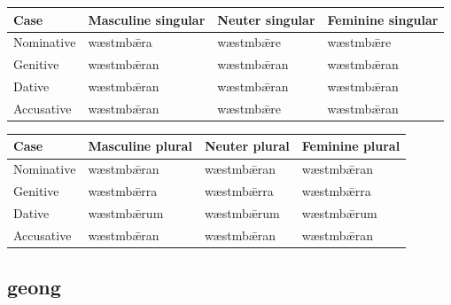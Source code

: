 \par\begingroup
\fontsize{10.5}{13.2}\selectfont
\setlength{\LTleft}{0pt}\setlength{\LTright}{\fill}
\noindent
\begin{tabular}{@{}>{\raggedright\arraybackslash}p{22.0mm}>{\raggedright\arraybackslash}p{31.188mm}>{\raggedright\arraybackslash}p{31.188mm}>{\raggedright\arraybackslash}p{31.188mm}@{}}
\toprule
\textbf{Case} & \textbf{Masculine singular} & \textbf{Neuter singular} & \textbf{Feminine singular} \\
\midrule
Nominative & wæstmbǣra & wæstmbǣre & wæstmbǣre \\
Genitive & wæstmbǣran & wæstmbǣran & wæstmbǣran \\
Dative & wæstmbǣran & wæstmbǣran & wæstmbǣran \\
Accusative & wæstmbǣran & wæstmbǣre & wæstmbǣran \\
\bottomrule
\end{tabular}
\par\endgroup
\par\addvspace{5pt}
\par\begingroup
\fontsize{10.5}{13.2}\selectfont
\setlength{\LTleft}{0pt}\setlength{\LTright}{\fill}
\noindent
\begin{tabular}{@{}>{\raggedright\arraybackslash}p{22.0mm}>{\raggedright\arraybackslash}p{31.188mm}>{\raggedright\arraybackslash}p{31.188mm}>{\raggedright\arraybackslash}p{31.188mm}@{}}
\toprule
\textbf{Case} & \textbf{Masculine plural} & \textbf{Neuter plural} & \textbf{Feminine plural} \\
\midrule
Nominative & wæstmbǣran & wæstmbǣran & wæstmbǣran \\
Genitive & wæstmbǣrra & wæstmbǣrra & wæstmbǣrra \\
Dative & wæstmbǣrum & wæstmbǣrum & wæstmbǣrum \\
Accusative & wæstmbǣran & wæstmbǣran & wæstmbǣran \\
\bottomrule
\end{tabular}
\par\endgroup

\subsection*{geong}

